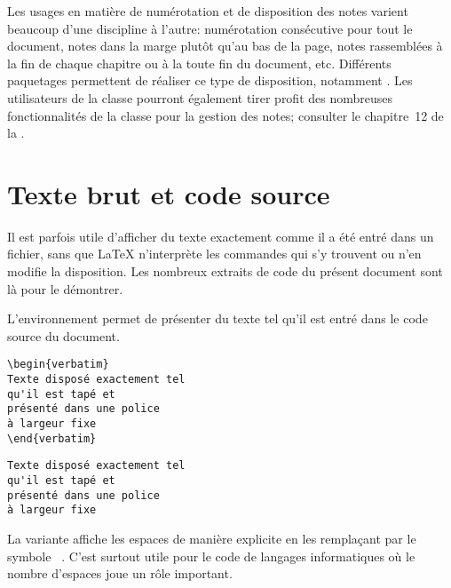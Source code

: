 Les usages en matière de numérotation et de disposition des notes
varient beaucoup d'une discipline à l'autre: numérotation consécutive
pour tout le document, notes dans la marge plutôt qu'au bas de la
page, notes rassemblées à la fin de chaque chapitre ou à la toute fin
du document, etc. Différents paquetages permettent de réaliser ce type
de disposition, notamment  \citep{footmisc}. Les
utilisateurs de la classe  pourront également tirer
profit des nombreuses fonctionnalités de la classe  pour
la gestion des notes; consulter le chapitre~12 de la %
.


\section{Texte brut et code source}
\label{sec::apparence:code}

Il est parfois utile d'afficher du texte exactement comme il a été
entré dans un fichier, sans que {\LaTeX} n'interprète les commandes
qui s'y trouvent ou n'en modifie la disposition. Les nombreux extraits
de code du présent document sont là pour le démontrer.

L'environnement  permet de présenter du texte tel qu'il
est entré dans le code source du document.
\begin{demo}
  \begin{texample}
\begin{lstlisting}
\begin{verbatim}
Texte disposé exactement tel
qu'il est tapé et
présenté dans une police
à largeur fixe
\end{verbatim}
\end{lstlisting}
    \producing
\begin{verbatim}
Texte disposé exactement tel
qu'il est tapé et
présenté dans une police
à largeur fixe
\end{verbatim}
\end{texample}
\end{demo}
La variante  affiche les espaces de manière explicite en
les remplaçant par le symbole \verb*| |. C'est surtout utile pour le
code de langages informatiques où le nombre d'espaces joue un rôle
important.

